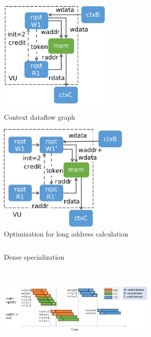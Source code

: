 \begin{figure}
\centering
\begin{subfigure}[b]{0.5\textwidth}
  \centering
\includegraphics[width=0.6\textwidth]{figs/densespecial.pdf}
\caption{Context dataflow graph}
\includegraphics[width=0.7\textwidth]{figs/denseaddr.pdf}
\caption{Optimization for long address calculation}
\label{fig:densespecial}
\end{subfigure}
\hfill
\begin{subfigure}[b]{0.48\textwidth}
  \centering
\inputminted{python}{code/densectx.py}
\caption{Dense specialization}
\end{subfigure} \\
\vspace{0.2cm}
\begin{subfigure}[b]{1\textwidth}
  \centering
\includegraphics[width=0.85\textwidth]{figs/densetiming.pdf}

\end{subfigure}
\end{figure}
